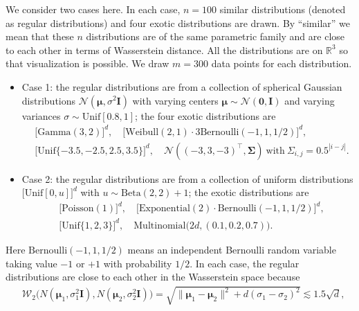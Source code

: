 \documentclass{imsart}
\numberwithin{equation}{section}
\def\R{\mathbb{R}}
\def\x{\mathbf{x}}
\def\x{\mathbf x}
\def\bSigma{\boldsymbol{\Sigma}}
\begin{document}
We consider two cases here. In each case, $n=100$ similar distributions (denoted as regular distributions) and four exotic distributions are drawn. By ``similar'' we mean that these $n$ distributions are of the same parametric family and are close to each other in terms of Wasserstein distance. All the distributions are on $\R^3$ so that visualization is possible. We draw $m=300$ data points for each distribution. 
\begin{itemize}
	\item Case 1: the regular distributions are from a collection of spherical Gaussian distributions $\mathcal{N}(\boldsymbol{\mu}, \sigma^2\boldsymbol{I})$ with varying centers $\boldsymbol{\mu} \sim  \mathcal{N}(\boldsymbol{0}, \boldsymbol{I})$ and varying variances $\sigma
	\sim
	\mathrm{Unif}[0.8,1]$;   
	the four exotic distributions are 
	\begin{align*}
		&\big[ \mathrm{Gamma}(3,2) \big]^d,\quad \big[ \mathrm{Weibull}(2,1) \cdot 3\mathrm{Bernoulli}(-1,1,1/2)\big]^d,   \\
		&\big[ \mathrm{Unif}\{-3.5, -2.5, 2.5, 3.5\} \big]^d, \quad
		\mathcal{N}((-3, 3, -3)^\top, \bSigma)\ \text{with}\ \Sigma_{i,j}=0.5^{|i-j|} .
	\end{align*}
	
	\item Case 2: the regular distributions are from a collection of uniform distributions $\big[ \mathrm{Unif}[0, u] \big]^d$ with $u\sim \mathrm{Beta}(2,2) + 1$; the exotic distributions are 
	\begin{align*}
		&\big[\mathrm{Poisson}(1)\big]^d, \quad \big[\mathrm{Exponential}(2) \cdot \mathrm{Bernoulli}(-1,1,1/2)\big]^d, \\
		&\big[\mathrm{Unif}\{ 1,2,3 \}\big]^d, \quad \mathrm{Multinomial}\big(2d, (0.1, 0.2, 0.7)\big).
	\end{align*}
\end{itemize}
Here $\mathrm{Bernoulli}(-1,1,1/2)$ means an independent Bernoulli random variable taking value $-1$ or $+1$ with probability $1/2$.
In each case, the regular distributions are close to each other in the Wasserstein space because
\begin{align*}
	&\mathcal{W}_2\Big(N(\boldsymbol{\mu}_1, \sigma_1^2\boldsymbol{I}), N(\boldsymbol{\mu}_2, \sigma_2^2\boldsymbol{I}) \Big) =\sqrt{\|\boldsymbol{\mu}_1 - \boldsymbol{\mu}_2\|^2 + d(\sigma_1-\sigma_2)^2}
	\lesssim 1.5\sqrt{d},
\end{align*}
\end{document}

